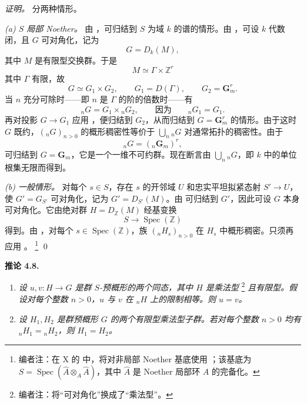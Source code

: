 \emph{证明。}
分两种情形。

\smallskip
{}\noindent\textit{(a) \(S\) 局部 Noether。}
由 ，可归结到 \(S\) 为域 \(k\) 的谱的情形。由 ，可设 \(k\) 代数闭，且 \(G\) 可对角化，记为
\[
  G=D_k(M),
\]
其中 \(M\) 是有限型交换群。于是
\[
  M\simeq\Gamma\times\mathbb Z^r
\]
其中 \(\Gamma\) 有限，故
\[
  G\simeq G_1\times G_2,
  \qquad
  G_1=D(\Gamma),
  \qquad
  G_2=\mathbf G_m^r.
\]
当 \(n\) 充分可除时——即 \(n\) 是 \(\Gamma\) 的阶的倍数时——有
\[
  {}_nG=G_1\times{}_nG_2,
  \qquad\text{因为}\qquad
  {}_nG_1=G_1.
\]
再对投影 \(G\to G_1\) 应用 ，便归结到 \(G_2\)，从而归结到 \(G=\mathbf G_m^r\) 的情形。由于这时 \(G\) 既约，\(({}_nG)_{n>0}\) 的概形稠密性等价于 \(\bigcup_n{}_nG\) 对通常拓扑的稠密性。由于
\[
  {}_nG=({}_n\mathbf G_m)^r,
\]
可归结到 \(G=\mathbf G_m\)，它是一个一维不可约群。现在断言由 \(\bigcup_n{}_nG\)，即 \(k\) 中的单位根集无限而得到。

\smallskip
{}\noindent\textit{(b) 一般情形。}
对每个 \(s\in S\)，存在 \(s\) 的开邻域 \(U\) 和忠实平坦拟紧态射 \(S'\to U\)，使 \(G'=G_{S'}\) 可对角化，记为 \(G'=D_{S'}(M)\)。由  可归结到 \(G'\)，因此可设 \(G\) 本身可对角化。它由绝对群 \(H=D_{\mathbb Z}(M)\) 经基变换
\[
  S\longrightarrow\operatorname{Spec}(\mathbb Z)
\]
得到。由 ，对每个 \(s\in\operatorname{Spec}(\mathbb Z)\)，族 \(({}_nH_s)_{n>0}\) 在 \(H_s\) 中概形稠密。只须再应用 。%
\footnote{编者注：在 X 的  中，将对非局部 Noether 基底使用 ；该基底为 \(S=\operatorname{Spec}(\widehat A\otimes_A\widehat A)\)，其中 \(\widehat A\) 是 Noether 局部环 \(A\) 的完备化。}
\qed

\medskip
\noindent{}\textbf{推论 4.8.}
\begin{enumerate}
  \item[(a)]
  \textit{设 \(u,v:H\to G\) 是群 \(S\)-预概形的两个同态，其中 \(H\) 是乘法型}%
  \footnote{编者注：将“可对角化”换成了“乘法型”。}
  \textit{且有限型。假设对每个整数 \(n>0\)，\(u\) 与 \(v\) 在 \({}_nH\) 上的限制相等。则 \(u=v\)。}

  \item[(b)]
  \textit{设 \(H_1,H_2\) 是群预概形 \(G\) 的两个有限型乘法型子群。若对每个整数 \(n>0\) 均有 \({}_nH_1={}_nH_2\)，则 \(H_1=H_2\)。}
\end{enumerate}

